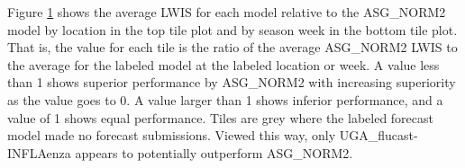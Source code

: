 Figure \ref{fig:state_and_date_lwis} shows the average LWIS for each model
relative to the ASG\_NORM2 model by location in the top tile plot and by 
season week in the bottom tile plot. That is, the value for each tile is the 
ratio of the average ASG\_NORM2 LWIS to the average for the labeled model at the
labeled location or week. A value less than 1 shows superior performance by
ASG\_NORM2 with increasing superiority as the value goes to 0. A value larger
than 1 shows inferior performance, and a value of 1 shows equal performance.
Tiles are grey where the labeled forecast model made no forecast submissions.
Viewed this way, only UGA\_flucast-INFLAenza appears to potentially outperform
ASG\_NORM2.

\begin{figure}[hbt!]
\begin{adjustwidth}{-3cm}{-1.5cm}
    \end{adjustwidth}
    \caption{}
    \label{fig:state_and_date_lwis}
    
\end{figure}




